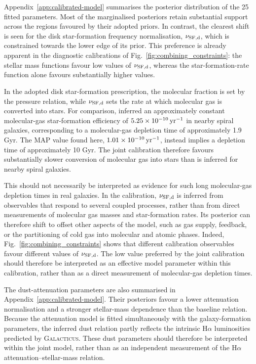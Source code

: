\documentclass[twocolumn, apj, numberedappendix, iop]{openjournal}
\newcommand{\galacticus}{\textsc{Galacticus}\xspace}
\newcommand{\ha}{H$\alpha$}
\newcommand{\gbten}{\citetalias{2010MNRAS.409..421G}\xspace}
\begin{document}
Appendix~\ref{app:calibrated-model} summarises the posterior distribution of
the 25 fitted parameters. Most of the marginalised posteriors retain
substantial support across the regions favoured by their adopted priors.
In contrast, the clearest shift is seen for the disk star-formation frequency
normalisation, \(\nu_{\rm SF,d}\), which is constrained towards the lower
edge of its prior. This preference is already apparent in the diagnostic
calibrations of Fig.~\ref{fig:combining_constraints}: the stellar mass
functions favour low values of \(\nu_{\rm SF,d}\), whereas the
star-formation-rate function alone favours substantially higher values.

In the adopted disk star-formation prescription, the molecular fraction is
set by the \citet{2006ApJ...650..933B} pressure relation, while \(\nu_{\rm SF,d}\) sets the rate at which
molecular gas is converted into stars. For comparison,
\citet{2008AJ....136.2782L} inferred an approximately constant molecular-gas
star-formation efficiency of \(5.25\times10^{-10}\,{\rm yr}^{-1}\) in nearby
spiral galaxies, corresponding to a molecular-gas depletion time of approximately 1.9 Gyr. The MAP value found here, \(1.01\times10^{-10}\,{\rm yr}^{-1}\), instead implies a depletion time of approximately 10 Gyr. The joint
calibration therefore favours substantially slower conversion of molecular
gas into stars than is inferred for nearby spiral galaxies.

This should not necessarily be interpreted as evidence for such long
molecular-gas depletion times in real galaxies. In the calibration,
$\nu_{\rm SF,d}$ is inferred from observables that respond to several coupled
processes, rather than from direct measurements of molecular gas masses and
star-formation rates. Its posterior can therefore shift to offset other aspects
of the model, such as gas supply, feedback, or the partitioning of cold gas into
molecular and atomic phases. Indeed, Fig.~\ref{fig:combining_constraints} shows
that different calibration observables favour different values of
$\nu_{\rm SF,d}$. The low value preferred by the joint calibration should
therefore be interpreted as an effective model parameter within this calibration,
rather than as a direct measurement of molecular-gas depletion times.


The dust-attenuation parameters are also summarised in
Appendix~\ref{app:calibrated-model}. Their posteriors favour a lower
attenuation normalisation and a stronger stellar-mass dependence than the
baseline \gbten{} relation. Because the attenuation model is fitted simultaneously with the
galaxy-formation parameters, the inferred dust relation partly reflects the
intrinsic \ha{} luminosities predicted by \galacticus{}. These dust parameters
should therefore be interpreted within the joint model, rather than as an
independent measurement of the \ha{} attenuation--stellar-mass relation.
\end{document}
